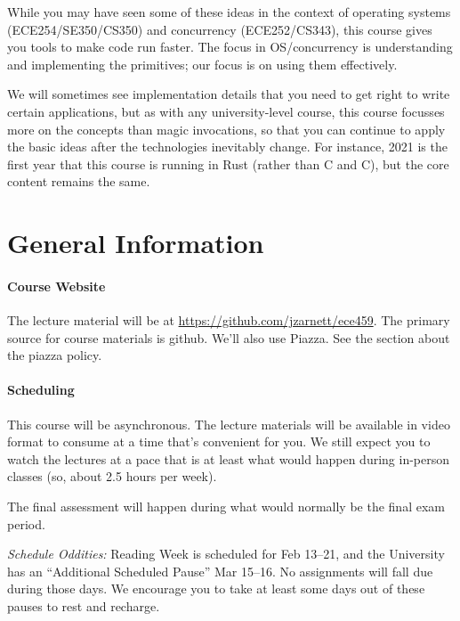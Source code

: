\documentclass[letterpaper,10pt]{article}
\newcommand{\CPP}{C\nolinebreak\hspace{-.05em}\raisebox{.4ex}{\tiny\bf +}\nolinebreak\hspace{-.10em}\raisebox{.4ex}{\tiny\bf +}}
\def\CPP{{C\nolinebreak[4]\hspace{-.05em}\raisebox{.4ex}{\tiny\bf ++}}}
\begin{document}
While you may have seen some of these ideas in the context of
operating systems (ECE254/SE350/CS350) and concurrency (ECE252/CS343), this course gives you tools to make code run
faster. The focus in OS/concurrency is understanding and implementing the
primitives; our focus is on using them effectively. 

We will sometimes see implementation details that you need to get right to write
certain applications, but as with any university-level course, this course
focusses more on the concepts than magic invocations, so that you can continue
to apply the basic ideas after the technologies inevitably change. For instance,
2021 is the first year that this course is running in Rust (rather than C and \CPP),
but the core content remains the same.


\section*{General Information}

\paragraph{Course Website} The lecture material will be at \url{https://github.com/jzarnett/ece459}. The primary source for course materials is github. We'll also use Piazza. See the section about the piazza policy.

\paragraph{Scheduling}
This course will be asynchronous. The lecture materials will be available in video format to consume at a time that's convenient for you. We still expect you to watch the lectures at a pace that is at least what would happen during in-person classes (so, about 2.5 hours per week). 


  
The final assessment will happen during what would normally be the final exam period. 

\textit{Schedule Oddities:} Reading Week is scheduled for Feb 13--21, and the University has an ``Additional Scheduled Pause'' Mar 15--16. No assignments will fall due during those days. We encourage you to take at least some days out of these pauses to rest and recharge.
\end{document}
